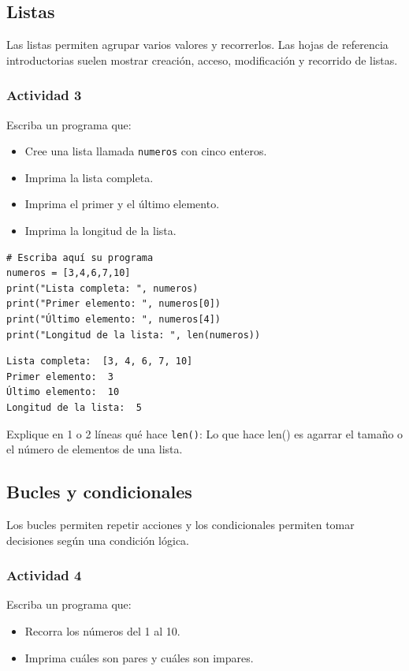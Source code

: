 \documentclass{article}
\begin{document}
\subsection{Listas}
\label{sec:org2ed2bed}
Las listas permiten agrupar varios valores y recorrerlos. Las hojas de
referencia introductorias suelen mostrar creación, acceso,
modificación y recorrido de listas.

\subsubsection{Actividad 3}
\label{sec:org23d5670}
Escriba un programa que:
\begin{itemize}
\item Cree una lista llamada \texttt{numeros} con cinco enteros.
\item Imprima la lista completa.
\item Imprima el primer y el último elemento.
\item Imprima la longitud de la lista.
\end{itemize}

\begin{verbatim}
# Escriba aquí su programa
numeros = [3,4,6,7,10]
print("Lista completa: ", numeros)
print("Primer elemento: ", numeros[0])
print("Último elemento: ", numeros[4])
print("Longitud de la lista: ", len(numeros))
\end{verbatim}

\begin{verbatim}
Lista completa:  [3, 4, 6, 7, 10]
Primer elemento:  3
Último elemento:  10
Longitud de la lista:  5
\end{verbatim}


Explique en 1 o 2 líneas qué hace \texttt{len()}:
Lo que hace len() es agarrar el tamaño o el número de elementos de una lista.
\subsection{Bucles y condicionales}
\label{sec:org7ddec57}
Los bucles permiten repetir acciones y los condicionales permiten tomar decisiones según una condición lógica.

\subsubsection{Actividad 4}
\label{sec:orgdfe35f8}
Escriba un programa que:
\begin{itemize}
\item Recorra los números del 1 al 10.
\item Imprima cuáles son pares y cuáles son impares.
\end{itemize}
\end{document}
